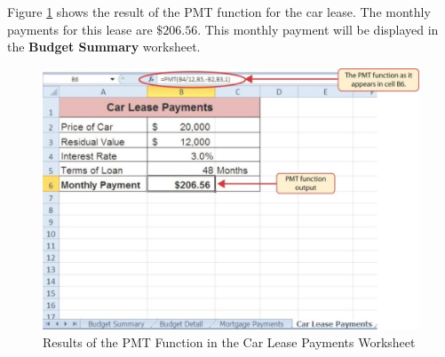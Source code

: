 Figure \ref{02:fig35} shows the result of the PMT function for the car lease. The monthly payments for this lease are $ \$206.56 $. This monthly payment will be displayed in the \textbf{Budget Summary} worksheet.

\begin{figure}[H]
	\centering
	\includegraphics[width=\maxwidth{.95\linewidth}]{gfx/ch02_fig35}
	\caption{Results of the PMT Function in the Car Lease Payments Worksheet}
	\label{02:fig35}
\end{figure}

